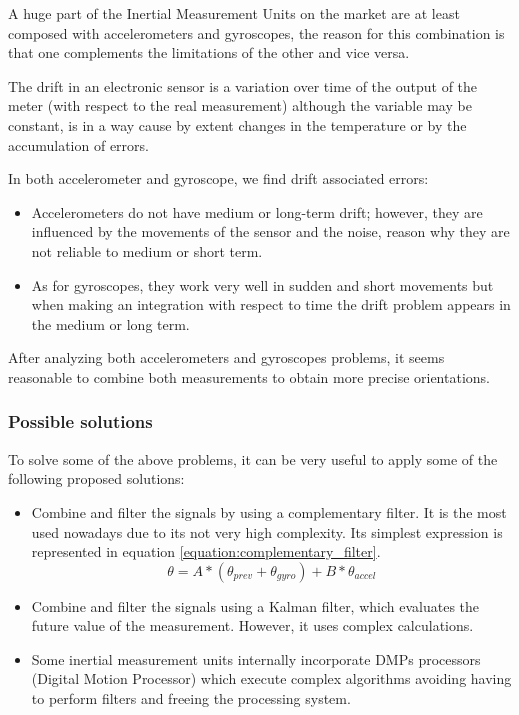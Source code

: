 A huge part of the Inertial Measurement Units on the market are at least composed with accelerometers and gyroscopes, the reason for this combination is that one complements the limitations of the other and vice versa. \newline

The drift in an electronic sensor is a variation over time of the output of the meter (with respect to the real measurement) although the variable may be constant, is in a way cause by extent changes in the temperature or by the accumulation of errors. \newline

In both accelerometer and gyroscope, we find drift associated errors: 
\begin{itemize}
	\item Accelerometers do not have medium or long-term drift; however, they are influenced by the movements of the sensor and the noise, reason why they are not reliable to medium or short term.
	\item As for gyroscopes, they work very well in sudden and short movements but when making an integration with respect to time the drift problem appears in the medium or long term.
\end{itemize} 

After analyzing both accelerometers and gyroscopes problems, it seems reasonable to combine both measurements to obtain more precise orientations.

\subsubsection{Possible solutions}

To solve some of the above problems, it can be very useful to apply some of the following proposed solutions: 

\begin{itemize}
	\item Combine and filter the signals by using a complementary filter. It is the most used nowadays due to its not very high complexity. Its simplest expression is represented in equation \ref{equation:complementary_filter}.
	\begin{equation} \label{equation:complementary_filter}
	\theta = A * (\theta_{prev}+\theta_{gyro}) + B * \theta_{accel}
	\end{equation}
	\item Combine and filter the signals using a Kalman filter, which evaluates the future value of the measurement. However, it uses complex calculations. 
	\item Some inertial measurement units internally incorporate DMPs processors (Digital Motion Processor) which execute complex algorithms avoiding having to perform filters and freeing the processing system.
\end{itemize}

